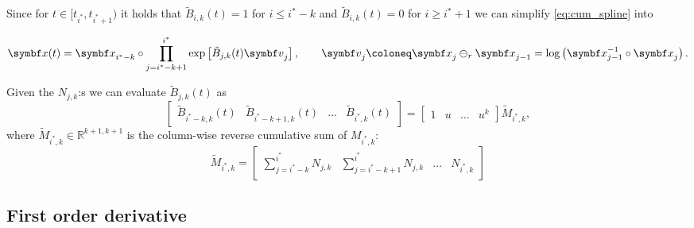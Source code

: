 Since for $t \in [t_{i^*}, t_{i^*+1})$ it holds that $\tilde B_{i, k}(t) = 1$ for $i \leq i^* - k$ and $\tilde B_{i, k}(t) = 0$ for $i \geq i^* + 1$ we can simplify \eqref{eq:cum_spline} into
\begin{important}
  \begin{equation}
    \label{eq:simple_lie_spline}
    \x(t) = \x_{i^* - k} \circ \prod_{j=i^* - k + 1}^{i^*} \exp \left[ \tilde B_{j, k} (t) \bv_j \right], \qquad \bv_j \coloneq \x_j \ominus_r \x_{j-1} = \log \left( \x_{j-1}^{-1} \circ \x_j \right).
  \end{equation}
\end{important}
Given the $N_{j, k}$:s we can evaluate $\tilde B_{j, k}(t)$ as
\begin{equation}
  \begin{bmatrix} \tilde B_{i^* - k, k}(t) & \tilde B_{i^* - k+1, k}(t) & \hdots & \tilde B_{i^*, k}(t) \end{bmatrix}  = \begin{bmatrix} 1 & u & \hdots & u^k \end{bmatrix} \tilde M_{i^*, k},
\end{equation}
where $\tilde M_{i^*, k} \in \mathbb{R}^{k+1, k+1}$ is the column-wise reverse cumulative sum of $M_{i^*,k}$:
\begin{equation}
  \label{eq:cumulative_coeff_matrix}
  \tilde M_{i^*, k} = \begin{bmatrix} \sum\limits_{j=i^*-k}^{i^*} N_{j,k} & \sum\limits_{j=i^*-k+1}^{i^*} N_{j,k} & \hdots & N_{i^*,k} \end{bmatrix}
\end{equation}

\subsection{First order derivative}

